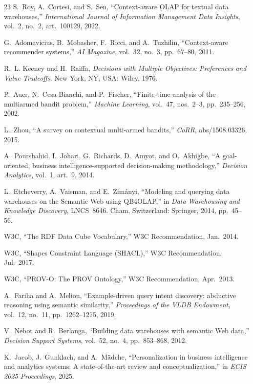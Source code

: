 \documentclass[journal]{IEEEtran}
\begin{document}
\begin{thebibliography}{23}
S.~Roy, A.~Cortesi, and S.~Sen, ``Context-aware OLAP for textual data warehouses,'' \emph{International Journal of Information Management Data Insights}, vol.~2, no.~2, art.~100129, 2022.

G.~Adomavicius, B.~Mobasher, F.~Ricci, and A.~Tuzhilin, ``Context-aware recommender systems,'' \emph{AI Magazine}, vol.~32, no.~3, pp.~67--80, 2011.

R.~L. Keeney and H.~Raiffa, \emph{Decisions with Multiple Objectives: Preferences and Value Tradeoffs}. New York, NY, USA: Wiley, 1976.

P.~Auer, N.~Cesa-Bianchi, and P.~Fischer, ``Finite-time analysis of the multiarmed bandit problem,'' \emph{Machine Learning}, vol.~47, nos.~2--3, pp.~235--256, 2002.

L.~Zhou, ``A survey on contextual multi-armed bandits,'' \emph{CoRR}, abs/1508.03326, 2015.

A.~Pourshahid, I.~Johari, G.~Richards, D.~Amyot, and O.~Akhigbe, ``A goal-oriented, business intelligence-supported decision-making methodology,'' \emph{Decision Analytics}, vol.~1, art.~9, 2014.

L.~Etcheverry, A.~Vaisman, and E.~Zim\'anyi, ``Modeling and querying data warehouses on the Semantic Web using QB4OLAP,'' in \emph{Data Warehousing and Knowledge Discovery}, LNCS~8646. Cham, Switzerland: Springer, 2014, pp.~45--56.

W3C, ``The RDF Data Cube Vocabulary,'' W3C Recommendation, Jan.~2014.

W3C, ``Shapes Constraint Language (SHACL),'' W3C Recommendation, Jul.~2017.

W3C, ``PROV-O: The PROV Ontology,'' W3C Recommendation, Apr.~2013.

A.~Fariha and A.~Meliou, ``Example-driven query intent discovery: abductive reasoning using semantic similarity,'' \emph{Proceedings of the VLDB Endowment}, vol.~12, no.~11, pp.~1262--1275, 2019.

V.~Nebot and R.~Berlanga, ``Building data warehouses with semantic Web data,'' \emph{Decision Support Systems}, vol.~52, no.~4, pp.~853--868, 2012.


K.~Jacob, J.~Gunklach, and A.~M\"adche, ``Personalization in business intelligence and analytics systems: A state-of-the-art review and conceptualization,'' in \emph{ECIS 2025 Proceedings}, 2025.


\end{thebibliography}
\end{document}
